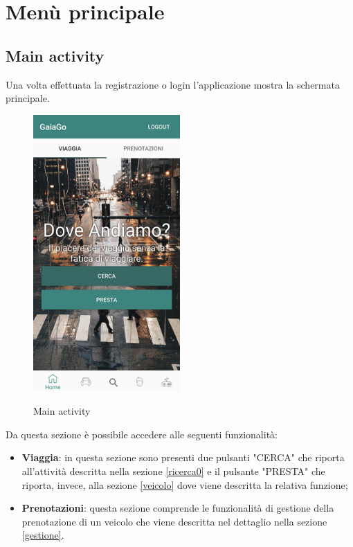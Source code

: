 \section{Menù principale}
\subsection{Main activity}
Una volta effettuata la registrazione o login l'applicazione mostra la schermata principale.
\begin{figure}[H] 
	\centering 
	\includegraphics[width=0.5\textwidth]{res/images/home.png}\\
	\caption{Main activity}
	\label{Login}
\end{figure}
\pagebreak 
Da questa sezione è possibile accedere alle seguenti funzionalità:
\begin{itemize}
	\item \textbf{Viaggia}: in questa sezione sono presenti due pulsanti "CERCA" che riporta all'attività descritta nella sezione \ref{ricerca0} e il pulsante "PRESTA" che riporta, invece, alla sezione \ref{veicolo} dove viene descritta la relativa funzione;
	\item \textbf{Prenotazioni}: questa sezione comprende le funzionalità di gestione della prenotazione di un veicolo che viene descritta nel dettaglio nella sezione \ref{gestione}.
\end{itemize}
